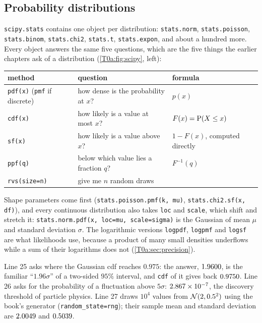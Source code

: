 \subsection{Probability distributions}
\label{T0a:sec:stats}

\texttt{scipy.stats} contains one object per distribution: \texttt{stats.norm}, \texttt{stats.poisson}, \texttt{stats.binom}, \texttt{stats.chi2}, \texttt{stats.t}, \texttt{stats.expon}, and about a hundred more. Every object answers the same five questions, which are the five things the earlier chapters ask of a distribution (\cref{T0a:fig:scipy}, left):
\begin{center}
\begin{tabular}{@{}lll@{}}
\toprule
method & question & formula \\
\midrule
\texttt{pdf(x)} (\texttt{pmf} if discrete) & how dense is the probability at $x$? & $p(x)$\\
\texttt{cdf(x)} & how likely is a value at most $x$? & $F(x)=\operatorname{P}(X\le x)$\\
\texttt{sf(x)} & how likely is a value above $x$? & $1-F(x)$, computed directly\\
\texttt{ppf(q)} & below which value lies a fraction $q$? & $F^{-1}(q)$\\
\texttt{rvs(size=n)} & give me $n$ random draws & \\
\bottomrule
\end{tabular}
\end{center}
Shape parameters come first (\texttt{stats.poisson.pmf(k, mu)}, \texttt{stats.chi2.sf(x, df)}), and every continuous distribution also takes \texttt{loc} and \texttt{scale}, which shift and stretch it: \texttt{stats.norm.pdf(x, loc=mu, scale=sigma)} is the Gaussian of mean $\mu$ and standard deviation $\sigma$. The logarithmic versions \texttt{logpdf}, \texttt{logpmf} and \texttt{logsf} are what likelihoods use, because a product of many small densities underflows while a sum of their logarithms does not (\cref{T0a:sec:precision}).


Line 25 asks where the Gaussian cdf reaches $0.975$: the answer, $1.9600$, is the familiar ``$1.96\sigma$'' of a two-sided $95\%$ interval, and \texttt{cdf} of it gives back $0.9750$. Line 26 asks for the probability of a fluctuation above $5\sigma$: $2.867\times10^{-7}$, the discovery threshold of particle physics. Line 27 draws $10^4$ values from $\mathcal{N}(2,0.5^2)$ using the book's generator (\texttt{random\_state=rng}); their sample mean and standard deviation are $2.0049$ and $0.5039$.

